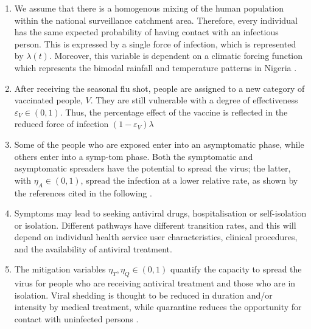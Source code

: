 \documentclass[12pt,a4paper]{article}
\theoremstyle{definition}
\theoremstyle{remark}
\begin{document}
\begin{enumerate}[leftmargin=*]


\item We assume that there is a homogenous mixing of the human population within the national surveillance catchment area. Therefore, every individual has the same expected probability of having contact with an infectious person. This is expressed by a single force of infection, which is represented by $\lambda(t)$. Moreover, this variable is dependent on a climatic forcing function which represents the bimodal rainfall and temperature patterns in Nigeria \cite{anderson1991infectious,bansal2007homogeneous}.



\item After receiving the seasonal flu shot, people are assigned to a new category of vaccinated people, $V$. They are still vulnerable with a degree of effectiveness $\varepsilon_V\in(0,1)$. Thus, the percentage effect of the vaccine is reflected in the reduced force of infection $(1-\varepsilon_V)\lambda$ \cite{halloran2009vaccine,hill2019seasonal}



\item Some of the people who are exposed enter into an asymptomatic phase, while others enter into a symp-tom phase. Both the symptomatic and asymptomatic spreaders have the potential to spread the virus; the latter, with $\eta_A\in(0,1)$, spread the infection at a lower relative rate, as shown by the references cited in the following \cite{patrozou2009asymptomatic,cowling2010household,tsang2023asymptomatic}.



\item Symptoms may lead to seeking antiviral drugs, hospitalisation or self-isolation or isolation. Different pathways have different transition rates, and this will depend on individual health service user characteristics, clinical procedures, and the availability of antiviral treatment.



\item The mitigation variables $\eta_T,\eta_Q\in(0,1)$ quantify the capacity to spread the virus for people who are receiving antiviral treatment and those who are in isolation. Viral shedding is thought to be reduced in duration and/or intensity by medical treatment, while quarantine reduces the opportunity for contact with uninfected persons \cite{hayden2018baloxavir,dobson2015oseltamivir,jefferson2014oseltamivir}.



\end{enumerate}
\end{document}
